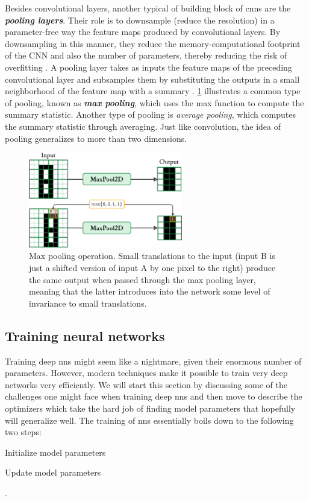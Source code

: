 Besides convolutional layers, another typical of building block of \glspl{cnn}
are the \emph{\textbf{pooling layers}}. Their role is to downsample (reduce the
resolution) in a parameter-free way the feature maps produced by convolutional
layers. By downsampling in this manner, they reduce the memory-computational
footprint of the CNN and also the number of parameters, thereby reducing the
risk of overfitting \parencite{ml}. A pooling layer takes as inputs the feature
maps of the preceding convolutional layer and subsamples them by substituting
the outputs in a small neighborhood of the feature map with a summary
\parencite{deeplearning}. \Figure{} \ref{fig:pooling} illustrates a common type
of pooling, known as \emph{\textbf{max pooling}}, which uses the max function to
compute the summary statistic. Another type of pooling is \emph{average
pooling}, which computes the summary statistic through averaging. Just like
convolution, the idea of pooling generalizes to more than two dimensions.

\begin{figure}
	\centering
	\includegraphics[width=0.6\textwidth]{fig/pooling.pdf}
	\caption[Max pooling operation.]{Max pooling operation. Small translations
	to the input (input B is just a shifted version of input A by one pixel to the
	right) produce the same output when passed through the max pooling layer,
	meaning that the latter introduces into the network some level of invariance
	to small translations.}
	\label{fig:pooling}
\end{figure}

\subsection{Training neural networks}
\label{subsec:nn_training}

Training deep \glspl{nn} might seem like a nightmare, given their enormous number
of parameters. However, modern techniques make it possible to train very deep
networks very efficiently. We will start this section by discussing some of the
challenges one might face when training deep \glspl{nn} and then move to
describe the optimizers which take the hard job of finding model parameters that
hopefully will generalize well. The training of \glspl{nn} essentially boils
down to the following two steps:
\begin{enumerate*}
	\item Initialize model parameters
	\item Update model parameters
\end{enumerate*}.

